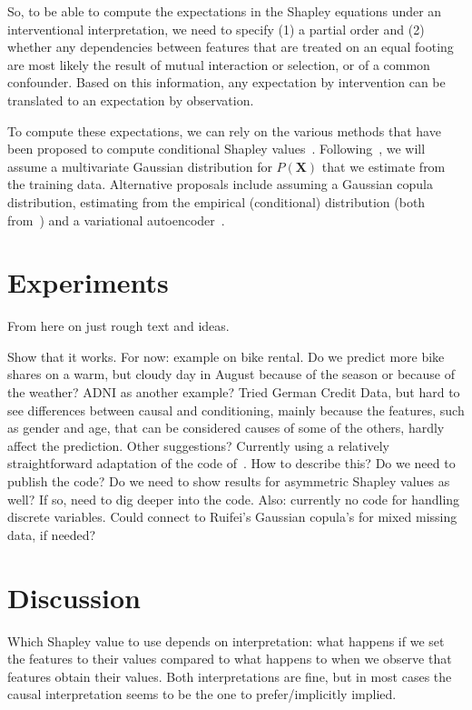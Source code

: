 \documentclass{article}
\newcommand{\vX}{\mathbf{X}}
\newcommand{\comment}[1]{{\color{red} #1}}
\begin{document}
So, to be able to compute the expectations in the Shapley equations under an interventional interpretation, we need to specify (1) a partial order and (2) whether any dependencies between features that are treated on an equal footing are most likely the result of mutual interaction or selection, or of a common confounder. Based on this information, any expectation by intervention can be translated to an expectation by observation.

To compute these expectations, we can rely on the various methods that have been proposed to compute conditional Shapley values~\cite{aas2019explaining,frye2019asymmetric}. Following~\cite{aas2019explaining}, we will assume a multivariate Gaussian distribution for $P(\vX)$ that we estimate from the training data. Alternative proposals include assuming a Gaussian copula distribution, estimating from the empirical (conditional) distribution (both from~\cite{aas2019explaining}) and a variational autoencoder~\cite{frye2019asymmetric}. 

\section{Experiments}

\comment{From here on just rough text and ideas.}

Show that it works. For now: example on bike rental. Do we predict more bike shares on a warm, but cloudy day in August because of the season or because of the weather? \comment{ADNI as another example? Tried German Credit Data, but hard to see differences between causal and conditioning, mainly because the features, such as gender and age, that can be considered causes of some of the others, hardly affect the prediction. Other suggestions?} \comment{Currently using a relatively straightforward adaptation of the code of~\cite{aas2019explaining}. How to describe this? Do we need to publish the code? Do we need to show results for asymmetric Shapley values as well? If so, need to dig deeper into the code. Also: currently no code for handling discrete variables. Could connect to Ruifei's Gaussian copula's for mixed missing data, if needed?}

\section{Discussion}

Which Shapley value to use depends on interpretation: what happens if we set the features to their values compared to what happens to when we observe that features obtain their values. Both interpretations are fine, but in most cases the causal interpretation seems to be the one to prefer/implicitly implied.
\end{document}
